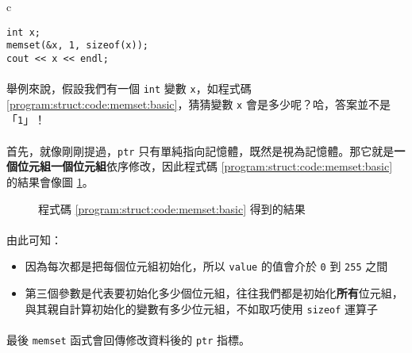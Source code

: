 \documentclass[12pt,a4paper,oneside]{article}
\begin{document}
\begin{CJK}{UTF8}{bkai}
\begin{code}[h!]
\centering
\begin{tabular}{c}
\begin{lstlisting}
int x;
memset(&x, 1, sizeof(x));
cout << x << endl;
\end{lstlisting}
\end{tabular}
\caption{\lstinline!memset! 的基本用法}
\label{program:struct:code:memset:basic}
\end{code}

\paragraph{}舉例來說，假設我們有一個 \lstinline!int! 變數 \lstinline!x!，如程式碼 \ref{program:struct:code:memset:basic}，猜猜變數 \lstinline!x! 會是多少呢？哈，答案並不是「\lstinline!1!」！
\paragraph{}首先，就像剛剛提過，\lstinline!ptr! 只有單純指向記憶體，既然是視為記憶體。那它就是\textbf{一個位元組一個位元組}依序修改，因此程式碼 \ref{program:struct:code:memset:basic} 的結果會像圖 \ref{program:struct:fig:memset:basic}。

\begin{figure}[h!]
\centering
{}
\caption{程式碼 \ref{program:struct:code:memset:basic} 得到的結果}
\label{program:struct:fig:memset:basic}
\end{figure}

\paragraph{}由此可知：
\begin{itemize}
\item 因為每次都是把每個位元組初始化，所以 \lstinline!value! 的值會介於 \lstinline!0! 到 \lstinline!255! 之間
\item 第三個參數是代表要初始化多少個位元組，往往我們都是初始化\textbf{所有}位元組，與其親自計算初始化的變數有多少位元組，不如取巧使用 \lstinline!sizeof! 運算子
\end{itemize}

\paragraph{}最後 \lstinline!memset! 函式會回傳修改資料後的 \lstinline!ptr! 指標。


\end{CJK}
\end{document}

